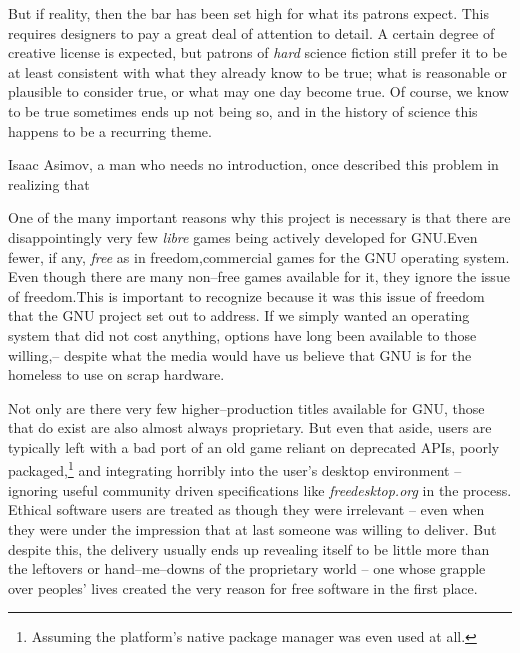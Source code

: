 But if reality, then the bar has been set high for what its patrons expect. This requires designers to pay a great deal of attention to detail. A certain degree of creative license is expected, but patrons of {\it hard} science fiction still prefer it to be at least consistent with what they already know to be true; what is reasonable or plausible to consider true, or what may one day become true. Of course, we know to be true sometimes ends up not being so, and in the history of science this happens to be a recurring theme.

Isaac Asimov, a man who needs no introduction, once described this problem in realizing that \footnotecite[extras={, p.~73.}][asimov1981]

One of the many important reasons why this project is necessary is that there are disappointingly very few {\it libre} games being actively developed for GNU. Even fewer, if any, {\it free} as in freedom, commercial games for the GNU operating system. Even though there are many non--free games available for it, they ignore the issue of freedom. This is important to recognize because it was this issue of freedom that the GNU project set out to address. If we simply wanted an operating system that did not cost anything, options have long been available to those willing,\footnotecite[piratebay] -- despite what the media would have us believe that GNU is for the homeless to use on scrap hardware.

Not only are there very few higher--production titles available for GNU, those that do exist are also almost always proprietary. But even that aside, users are typically left with a bad port of an old game reliant on deprecated APIs, poorly packaged,\footnote{Assuming the platform's native package manager was even used at all.} and integrating horribly into the user's desktop environment -- ignoring useful community driven specifications like {\it freedesktop.org} in the process. Ethical software users are treated as though they were irrelevant -- even when they were under the impression that at last someone was willing to deliver. But despite this, the delivery usually ends up revealing itself to be little more than the leftovers or hand--me--downs of the proprietary world -- one whose grapple over peoples' lives created the very reason for free software in the first place. 

